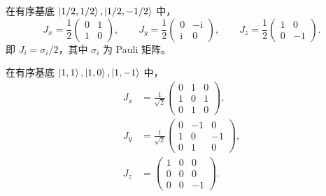 \begin{example}[$j=1/2$ 的矩阵表示]
在有序基底 $\Ket{1/2,1/2},\Ket{1/2,-1/2}$ 中，
\begin{equation}
J_x=\frac12\left(\begin{matrix}0&1\\1&0\end{matrix}\right),\qquad
J_y=\frac12\left(\begin{matrix}0&-\mathrm{i}\\\mathrm{i}&0\end{matrix}\right),\qquad
J_z=\frac12\left(\begin{matrix}1&0\\0&-1\end{matrix}\right).
\end{equation}
即 $J_i=\sigma_i/2$，其中 $\sigma_i$ 为 Pauli 矩阵。
\end{example}

\begin{example}[$j=1$ 的矩阵表示]
在有序基底 $\Ket{1,1},\Ket{1,0},\Ket{1,-1}$ 中，
\begin{align}
J_x&=\frac1{\sqrt2}\left(\begin{matrix}0&1&0\\1&0&1\\0&1&0\end{matrix}\right),\\
J_y&=\frac{\mathrm{i}}{\sqrt2}\left(\begin{matrix}0&-1&0\\1&0&-1\\0&1&0\end{matrix}\right),\\
J_z&=\left(\begin{matrix}1&0&0\\0&0&0\\0&0&-1\end{matrix}\right).
\end{align}
\end{example}
